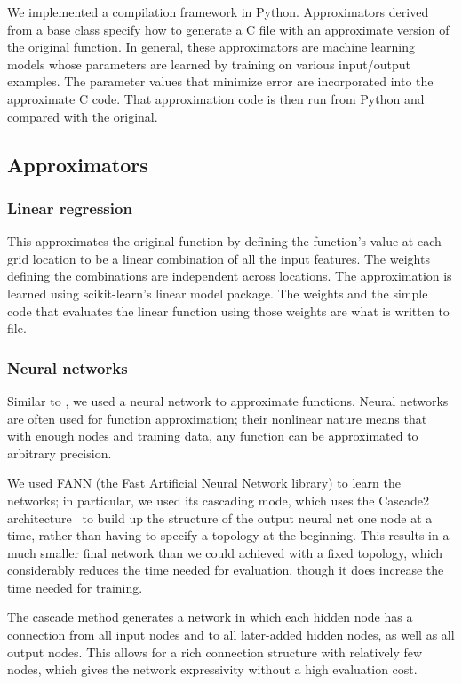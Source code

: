 \documentclass{article}
\begin{document}
We implemented a compilation framework in Python. Approximators derived from a base class specify how to generate a C file with an approximate version of the original function. In general, these approximators are machine learning models whose parameters are learned by training on various input/output examples. The parameter values that minimize error are incorporated into the approximate C code. That approximation code is then run from Python and compared with the original.

\subsection{Approximators}

\subsubsection{Linear regression}

This approximates the original function by defining the function's value at each grid location to be a linear combination of all the input features. The weights defining the combinations are independent across locations. The approximation is learned using scikit-learn's linear model package. The weights and the simple code that evaluates the linear function using those weights are what is written to file.

\subsubsection{Neural networks}

Similar to \cite{Esmaeilzadeh12}, we used a neural network to approximate functions. Neural networks are often used for function approximation; their nonlinear nature means that with enough nodes and training data, any function can be approximated to arbitrary precision.

We used FANN (the Fast Artificial Neural Network library) to learn the networks; in particular, we used its cascading mode, which uses the Cascade2 architecture~\cite{fahlman} to build up the structure of the output neural net one node at a time, rather than having to specify a topology at the beginning. This results in a much smaller final network than we could achieved with a fixed topology, which considerably reduces the time needed for evaluation, though it does increase the time needed for training.

The cascade method generates a network in which each hidden node has a connection from all input nodes and to all later-added hidden nodes, as well as all output nodes. This allows for a rich connection structure with relatively few nodes, which gives the network expressivity without a high evaluation cost.
\end{document}
